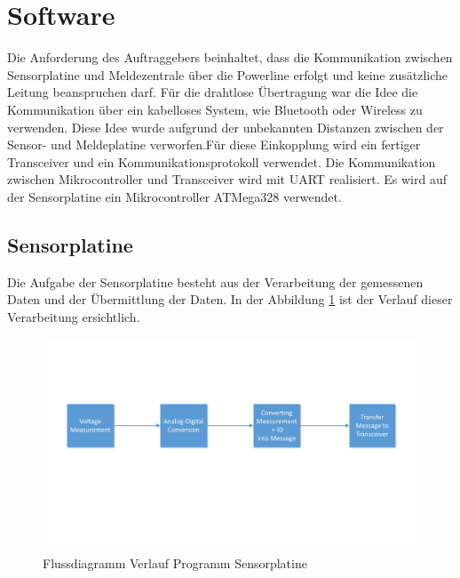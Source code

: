 %
%
%

\section{Software}
Die Anforderung des Auftraggebers beinhaltet, dass die Kommunikation zwischen Sensorplatine und Meldezentrale über die Powerline erfolgt und keine zusätzliche Leitung beanspruchen darf. Für die drahtlose Übertragung war die Idee die Kommunikation über ein kabelloses System, wie Bluetooth oder Wireless zu verwenden. Diese Idee wurde aufgrund der unbekannten Distanzen zwischen der Sensor- und Meldeplatine verworfen.Für diese Einkopplung wird ein fertiger Transceiver und ein Kommunikationsprotokoll verwendet. Die Kommunikation zwischen Mikrocontroller und Transceiver wird mit UART realisiert. Es wird auf der Sensorplatine ein Mikrocontroller ATMega328 verwendet.


\subsection{Sensorplatine}
Die Aufgabe der Sensorplatine besteht aus der Verarbeitung der gemessenen Daten und der Übermittlung der Daten. In der Abbildung \ref{fig:Software_Flussdiagramm_Sensorplatine} ist der Verlauf dieser Verarbeitung ersichtlich.

\begin{figure}[htbp] 
  \centering
     \includegraphics[width=1\textwidth]{graphics/Sensorplatine_Flussdiagramm}
  \caption{Flussdiagramm Verlauf Programm Sensorplatine}
  \label{fig:Software_Flussdiagramm_Sensorplatine}
\end{figure}

